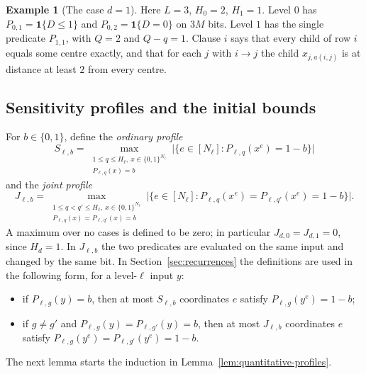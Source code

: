 \documentclass[11pt]{article}
\theoremstyle{definition}
\newtheorem{example}[theorem]{Example}
\theoremstyle{remark}
\begin{document}
\begin{example}[The case \(d=1\)]
Here \(L=3\), \(H_0=2\), \(H_1=1\). Level \(0\) has \(P_{0,1}=\mathbf 1\{D\le1\}\) and \(P_{0,2}=\mathbf 1\{D=0\}\) on \(3M\) bits.
Level \(1\) has the single predicate \(P_{1,1}\), with \(Q=2\) and \(Q-q=1\).
Clause \(i\) says that every child of row \(i\) equals some centre exactly, and that for each \(j\) with \(i\to j\) the child \(x_{j,a(i,j)}\) is at distance at least \(2\) from every centre.
\end{example}

\subsection{Sensitivity profiles and the initial bounds}

For \(b\in\{0,1\}\), define the \emph{ordinary profile}
\[
 S_{\ell,b}=\max_{\substack{1\le q\le H_\ell,\ x\in\{0,1\}^{N_\ell}\\
                           P_{\ell,q}(x)=b}}
 \bigl|\{e\in[N_\ell]:P_{\ell,q}(x^e)=1-b\}\bigr|
\]
and the \emph{joint profile}
\[
 J_{\ell,b}=\max_{\substack{1\le q<q'\le H_\ell,\ x\in\{0,1\}^{N_\ell}\\
                         P_{\ell,q}(x)=P_{\ell,q'}(x)=b}}
 \bigl|\{e\in[N_\ell]:P_{\ell,q}(x^e)=P_{\ell,q'}(x^e)=1-b\}\bigr|.
\]
A maximum over no cases is defined to be zero; in particular
\(J_{d,0}=J_{d,1}=0\), since \(H_d=1\).
In \(J_{\ell,b}\) the two predicates are evaluated on the same input and changed by the same bit.
In Section~\ref{sec:recurrences} the definitions are used in the following form, for a level-\(\ell\) input \(y\):
\begin{itemize}[leftmargin=*]
\item[(CS)] if \(P_{\ell,g}(y)=b\), then at most \(S_{\ell,b}\) coordinates \(e\) satisfy \(P_{\ell,g}(y^e)=1-b\);
\item[(CJ)] if \(g\ne g'\) and \(P_{\ell,g}(y)=P_{\ell,g'}(y)=b\), then at most \(J_{\ell,b}\) coordinates \(e\) satisfy \(P_{\ell,g}(y^e)=P_{\ell,g'}(y^e)=1-b\).
\end{itemize}

The next lemma starts the induction in Lemma~\ref{lem:quantitative-profiles}.
\end{document}
